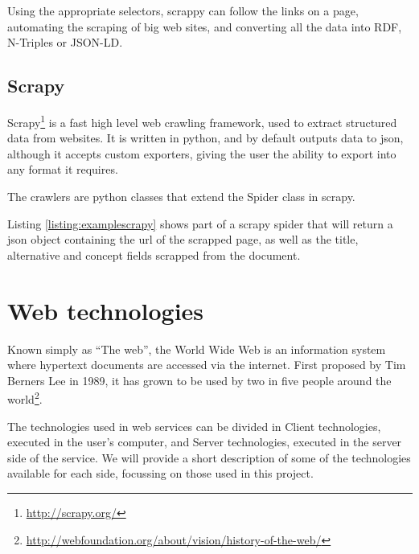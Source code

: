 \begin{center}
  
\end{center}

Using the appropriate selectors, scrappy can follow the links on a page, automating the scraping of big web sites, and converting all the data into RDF, N-Triples or JSON-LD.

\subsection{Scrapy}

Scrapy\footnote{\url{http://scrapy.org/}} is a fast high level web crawling framework, used to extract structured data from websites. It is written in python, and by default outputs data to json, although it accepts custom exporters, giving the user the ability to export into any format it requires.

The crawlers are python classes that extend the Spider class in scrapy.

\begin{center}
  
\end{center}

Listing \ref{listing:examplescrapy} shows part of a scrapy spider that will return a json object containing the url of the scrapped page, as well as the title, alternative and concept fields scrapped from the document.

\section{Web technologies}



Known simply as ``The web'', the World Wide Web is an information system where hypertext documents are accessed via the internet. First proposed by Tim Berners Lee in 1989\cite{berners1989information}, it has grown to be used by two in five people around the world\footnote{\url{http://webfoundation.org/about/vision/history-of-the-web/}}.

The technologies used in web services can be divided in Client technologies, executed in the user's computer, and Server technologies, executed in the server side of the service. We will provide a short description of some of the technologies available for each side, focussing on those used in this project.

